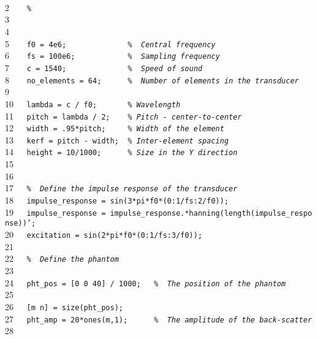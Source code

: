 \documentclass{manual}
\begin{document}
{\footnotesize{}\\
2{\tt~~~~}{\tt {\sl \%~}}\\
3{\tt~~~~}{\tt }\\
4{\tt~~~~}{\tt }\\
5{\tt~~~~}{\tt f0~=~4e6;~~~~~~~~~~~~~~{\sl \%~~Central~frequency}}\\
6{\tt~~~~}{\tt fs~=~100e6;~~~~~~~~~~~~{\sl \%~~Sampling~frequency}}\\
7{\tt~~~~}{\tt c~=~1540;~~~~~~~~~~~~~~{\sl \%~~Speed~of~sound}}\\
8{\tt~~~~}{\tt no\_elements~=~64;~~~~~~{\sl \%~~Number~of~elements~in~the~transducer}}\\
9{\tt~~~~}{\tt }\\
10{\tt~~~}{\tt lambda~=~c~/~f0;~~~~~~~{\sl \%~Wavelength}}\\
11{\tt~~~}{\tt pitch~=~lambda~/~2;~~~~{\sl \%~Pitch~-~center-to-center}}\\
12{\tt~~~}{\tt width~=~.95*pitch;~~~~~{\sl \%~Width~of~the~element}}\\
13{\tt~~~}{\tt kerf~=~pitch~-~width;~~{\sl \%~Inter-element~spacing}}\\
14{\tt~~~}{\tt height~=~10/1000;~~~~~~{\sl \%~Size~in~the~Y~direction}}\\
15{\tt~~~}{\tt ~}\\
16{\tt~~~}{\tt ~}\\
17{\tt~~~}{\tt {\sl \%~~Define~the~impulse~response~of~the~transducer}}\\
18{\tt~~~}{\tt impulse\_response~=~sin(3*pi*f0*(0:1/fs:2/f0));}\\
19{\tt~~~}{\tt impulse\_response~=~impulse\_response.*hanning(length(impulse\_response))';}\\
20{\tt~~~}{\tt excitation~=~sin(2*pi*f0*(0:1/fs:3/f0));}\\
21{\tt~~~}{\tt }\\
22{\tt~~~}{\tt {\sl \%~~Define~the~phantom}}\\
23{\tt~~~}{\tt }\\
24{\tt~~~}{\tt pht\_pos~=~[0~0~40]~/~1000;~~~{\sl \%~~The~position~of~the~phantom}}\\
25{\tt~~~}{\tt }\\
26{\tt~~~}{\tt [m~n]~=~size(pht\_pos);}\\
27{\tt~~~}{\tt pht\_amp~=~20*ones(m,1);~~~~~~{\sl \%~~The~amplitude~of~the~back-scatter}}\\
28{\tt~~~}{\tt }\\
}
\end{document}

